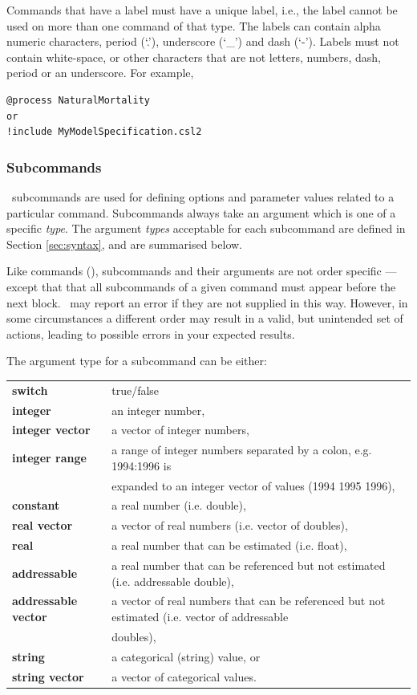 Commands that have a label must have a unique label, i.e., the label cannot be used on more than one command of that type. The labels can contain alpha numeric characters, period (`.'), underscore (`\_') and dash (`-'). Labels must not contain white-space, or other characters that are not letters, numbers, dash, period or an underscore. For example,

{\small{\begin{verbatim}
@process NaturalMortality
or
!include MyModelSpecification.csl2
		\end{verbatim}}}

\subsubsection{Subcommands}

\IBM\ subcommands are used for defining options and parameter values related to a particular command. Subcommands always take an argument which is one of a specific \emph{type}. The argument \emph{types} acceptable for each subcommand are defined in Section \ref{sec:syntax}, and are summarised below. 

Like commands (), subcommands and their arguments are not order specific --- except that that all subcommands of a given command must appear before the next  block. \IBM\ may report an error if they are not supplied in this way. However, in some circumstances a different order may result in a valid, but unintended set of actions, leading to possible errors in your expected results.  

The argument type for a subcommand can be either:

\begin{tabular}{ll}
\textbf{switch} & true/false\\ 
\textbf{integer}& an integer number,\\
\textbf{integer vector} & a vector of integer numbers,\\
\textbf{integer range} & a range of integer numbers separated by a colon, e.g. 1994:1996 is \\ & expanded to an integer vector of values (1994 1995 1996),\\
\textbf{constant} & a real number (i.e. double),\\
\textbf{real vector} & a vector of real numbers (i.e. vector of doubles),\\
\textbf{real} & a real number that can be estimated (i.e. float),\\
\textbf{addressable} & a real number that can be referenced but not estimated (i.e. addressable double),\\
\textbf{addressable vector} & a vector of real numbers that can be referenced but not estimated (i.e. vector of addressable \\ & doubles),\\
\textbf{string} & a categorical (string) value, or\\
\textbf{string vector} & a vector of categorical values.
\end{tabular}


